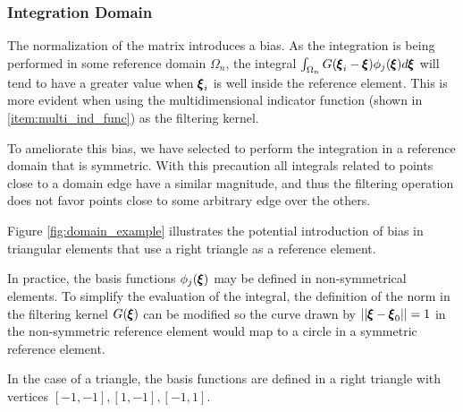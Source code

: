 \subsubsection{Integration Domain}

The normalization of the matrix introduces a bias. As the integration is being performed in some reference domain $\Omega_n$, the integral $\int_{\Omega_n} G({\pmb \xi}_i - {\pmb \xi})  \phi_j({\pmb \xi})d{\pmb \xi}$ will tend to have a greater value when ${\pmb \xi}_i$ is well inside the reference element. This is more evident when using the multidimensional indicator function (shown in \ref{item:multi_ind_func}) as the filtering kernel.

To ameliorate this bias, we have selected to perform the integration in a reference domain that is symmetric. With this precaution all integrals related to points close to a domain edge have a similar magnitude, and thus the filtering operation does not favor points close to some arbitrary edge over the others.

Figure \ref{fig:domain_example} illustrates the potential introduction of bias in triangular elements that use a right triangle as a reference element.

\begin{figure*}

    \hfill
\caption{Using the same filter width in two different domains introduces different bias. The small, solid circles represent the location of solution points. The large circles represent the filter width acting on two specific internal points in two different domains. Integration is being performed in the area encompassed by the solid, straight lines.}
\label{fig:domain_example}

\end{figure*}

In practice, the basis functions $\phi_j({\pmb \xi})$ may be defined in non-symmetrical elements. To simplify the evaluation of the integral, the definition of the norm in the filtering kernel $G({\pmb \xi})$ can be modified so the curve drawn by $||{\pmb \xi} -{\pmb \xi}_0|| = 1$ in the non-symmetric reference element would map to a circle in a symmetric reference element.

In the case of a triangle, the basis functions are defined in a right triangle with vertices $[-1,-1], [1,-1],[-1,1]$.

